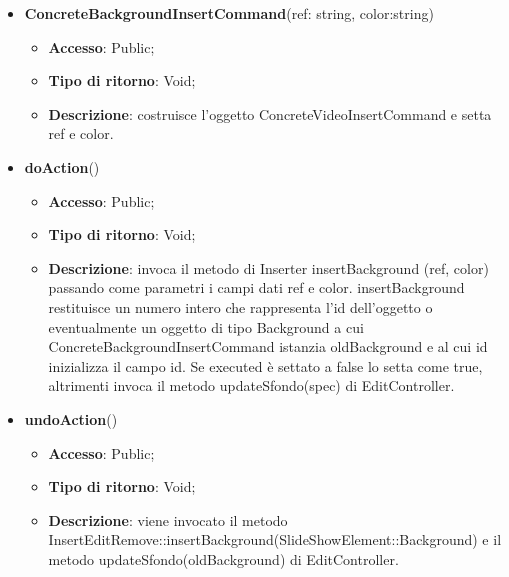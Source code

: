{{{	
	\begin{itemize}
		\item \textbf{ConcreteBackgroundInsertCommand}(ref: string, color:string)
		\begin{itemize}
			\item \textbf{Accesso}: Public;
			\item \textbf{Tipo di ritorno}: Void;
			\item \textbf{Descrizione}: costruisce l’oggetto ConcreteVideoInsertCommand e setta ref e color.
		\end{itemize}
		\item \textbf{doAction}()
		\begin{itemize}
			\item \textbf{Accesso}: Public;
			\item \textbf{Tipo di ritorno}: Void;
			\item \textbf{Descrizione}: invoca il metodo di Inserter insertBackground (ref, color) passando come parametri i  campi dati ref e color. insertBackground restituisce un numero intero che rappresenta l’id dell’oggetto o eventualmente un oggetto di tipo Background a cui ConcreteBackgroundInsertCommand istanzia oldBackground e al cui id inizializza il campo id. Se executed è settato a false lo setta come true, altrimenti invoca il metodo updateSfondo(spec) di EditController.
		\end{itemize}
		\item \textbf{undoAction}()
		\begin{itemize}
			\item \textbf{Accesso}: Public;
			\item \textbf{Tipo di ritorno}: Void;
			\item \textbf{Descrizione}: viene invocato il metodo InsertEditRemove::insertBackground(SlideShowElement::Background) e il metodo updateSfondo(oldBackground) di EditController.
		\end{itemize}
	\end{itemize}
	}

}}
